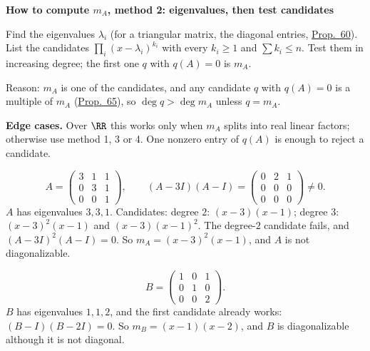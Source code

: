 \documentclass[10pt]{scrartcl}
\newenvironment{methodbox}[1]{\begin{mdframed}[style=mdbluebox,linecolor=NavyBlue,backgroundcolor=NavyBlue!3]\textbf{\color{NavyBlue}#1}\par\vspace{2pt}}{\end{mdframed}}
\begin{document}
\begin{methodbox}{How to compute $m_A$, method 2: eigenvalues, then test candidates}
\begin{enumerate}[label=\arabic*.,leftmargin=1.5em,itemsep=2pt,topsep=2pt]
  \ii Find the eigenvalues $\lambda_i$ (for a triangular matrix, the diagonal entries, \hyperref[prop-60]{Prop.~60}).
  \ii List the candidates $\prod_i(x-\lambda_i)^{k_i}$ with every $k_i\ge1$ and $\sum k_i\le n$.
  \ii Test them in increasing degree; the first one $q$ with $q(A)=0$ is $m_A$.
\end{enumerate}
Reason: $m_A$ is one of the candidates, and any candidate $q$ with $q(A)=0$ is a multiple of $m_A$ (\hyperref[prop-65]{Prop.~65}), so $\deg q>\deg m_A$ unless $q=m_A$.

\textbf{Edge cases.} Over $\RR$ this works only when $m_A$ splits into real linear factors; otherwise use method 1, 3 or 4. One nonzero entry of $q(A)$ is enough to reject a candidate.
\end{methodbox}
\begin{example*}
  \[ A=\begin{pmatrix}3&1&1\\0&3&1\\0&0&1\end{pmatrix},\qquad (A-3I)(A-I)=\begin{pmatrix}0&2&1\\0&0&0\\0&0&0\end{pmatrix}\ne0. \]
  $A$ has eigenvalues $3,3,1$. Candidates: degree $2$: $(x-3)(x-1)$; degree $3$: $(x-3)^2(x-1)$ and $(x-3)(x-1)^2$. The degree-$2$ candidate fails, and $(A-3I)^2(A-I)=0$. So $m_A=(x-3)^2(x-1)$, and $A$ is not diagonalizable.
\end{example*}
\begin{example*}
  \[ B=\begin{pmatrix}1&0&1\\0&1&0\\0&0&2\end{pmatrix}. \]
  $B$ has eigenvalues $1,1,2$, and the first candidate already works: $(B-I)(B-2I)=0$. So $m_B=(x-1)(x-2)$, and $B$ is diagonalizable although it is not diagonal.
\end{example*}
\end{document}
